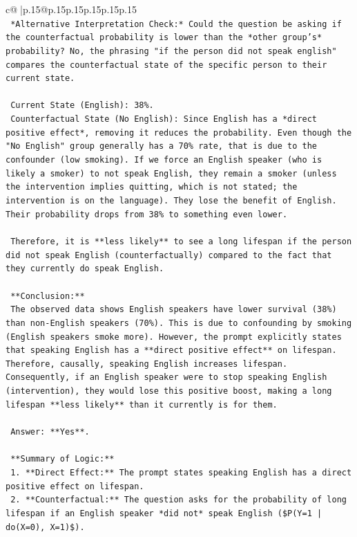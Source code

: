 \documentclass{article}
\begin{document}
{\begin{supertabular}{c@{$\;$}|p{.15\linewidth}@{}p{.15\linewidth}p{.15\linewidth}p{.15\linewidth}p{.15\linewidth}p{.15\linewidth}}
{{{\\ 
\texttt{    *Alternative Interpretation Check:* Could the question be asking if the counterfactual probability is lower than the *other group's* probability? No, the phrasing "if the person did not speak english" compares the counterfactual state of the specific person to their current state.} \\
\\ 
\texttt{    Current State (English): 38\%.} \\
\texttt{    Counterfactual State (No English): Since English has a *direct positive effect*, removing it reduces the probability. Even though the "No English" group generally has a 70\% rate, that is due to the confounder (low smoking). If we force an English speaker (who is likely a smoker) to not speak English, they remain a smoker (unless the intervention implies quitting, which is not stated; the intervention is on the language). They lose the benefit of English. Their probability drops from 38\% to something even lower.} \\
\\ 
\texttt{    Therefore, it is **less likely** to see a long lifespan if the person did not speak English (counterfactually) compared to the fact that they currently do speak English.} \\
\\ 
\texttt{    **Conclusion:**} \\
\texttt{    The observed data shows English speakers have lower survival (38\%) than non{-}English speakers (70\%). This is due to confounding by smoking (English speakers smoke more). However, the prompt explicitly states that speaking English has a **direct positive effect** on lifespan. Therefore, causally, speaking English increases lifespan. Consequently, if an English speaker were to stop speaking English (intervention), they would lose this positive boost, making a long lifespan **less likely** than it currently is for them.} \\
\\ 
\texttt{    Answer: **Yes**.} \\
\\ 
\texttt{    **Summary of Logic:**} \\
\texttt{    1.  **Direct Effect:** The prompt states speaking English has a direct positive effect on lifespan.} \\
\texttt{    2.  **Counterfactual:** The question asks for the probability of long lifespan if an English speaker *did not* speak English (\$P(Y=1 | do(X=0), X=1)\$).} \\
}}}
\end{supertabular}}
\end{document}
